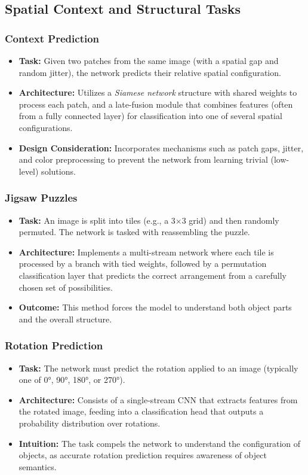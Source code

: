 \documentclass{article}
\begin{document}
\subsection{Spatial Context and Structural Tasks}
\subsubsection{Context Prediction}
\begin{itemize}
    \item \textbf{Task:} Given two patches from the same image (with a spatial gap and random jitter), the network predicts their relative spatial configuration.
    \item \textbf{Architecture:} Utilizes a \emph{Siamese network} structure with shared weights to process each patch, and a late-fusion module that combines features (often from a fully connected layer) for classification into one of several spatial configurations.
    \item \textbf{Design Consideration:} Incorporates mechanisms such as patch gaps, jitter, and color preprocessing to prevent the network from learning trivial (low-level) solutions.
\end{itemize}

\subsubsection{Jigsaw Puzzles}
\begin{itemize}
    \item \textbf{Task:} An image is split into tiles (e.g., a 3$\times$3 grid) and then randomly permuted. The network is tasked with reassembling the puzzle.
    \item \textbf{Architecture:} Implements a multi-stream network where each tile is processed by a branch with tied weights, followed by a permutation classification layer that predicts the correct arrangement from a carefully chosen set of possibilities.
    \item \textbf{Outcome:} This method forces the model to understand both object parts and the overall structure.
\end{itemize}

\subsubsection{Rotation Prediction}
\begin{itemize}
    \item \textbf{Task:} The network must predict the rotation applied to an image (typically one of 0°, 90°, 180°, or 270°).
    \item \textbf{Architecture:} Consists of a single-stream CNN that extracts features from the rotated image, feeding into a classification head that outputs a probability distribution over rotations.
    \item \textbf{Intuition:} The task compels the network to understand the configuration of objects, as accurate rotation prediction requires awareness of object semantics.
\end{itemize}
\end{document}
